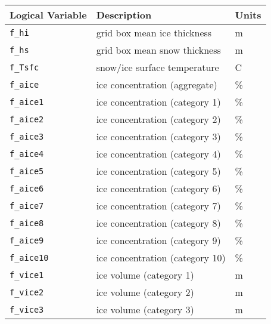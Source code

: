   \begin{center}
   \label{table:history_fields}
   \tablefirsthead{\hline}
   \tablelasttail{\hline}
   \begin{supertabular}{lll} \hline
Logical Variable          & Description                          & Units         \\
\hline \hline
\texttt{f\_hi}      & grid box mean ice thickness          & m             \\
\texttt{f\_hs}      & grid box mean snow thickness         & m             \\
\texttt{f\_Tsfc}    & snow/ice surface temperature         & C             \\
\texttt{f\_aice}    & ice concentration (aggregate)        & \%            \\
\texttt{f\_aice1}   & ice concentration (category 1)       & \%            \\
\texttt{f\_aice2}   & ice concentration (category 2)       & \%            \\
\texttt{f\_aice3}   & ice concentration (category 3)       & \%            \\
\texttt{f\_aice4}   & ice concentration (category 4)       & \%            \\
\texttt{f\_aice5}   & ice concentration (category 5)       & \%            \\
\texttt{f\_aice6}   & ice concentration (category 6)       & \%            \\
\texttt{f\_aice7}   & ice concentration (category 7)       & \%            \\
\texttt{f\_aice8}   & ice concentration (category 8)       & \%            \\
\texttt{f\_aice9}   & ice concentration (category 9)       & \%            \\
\texttt{f\_aice10}  & ice concentration (category 10)      & \%            \\
\texttt{f\_vice1}   & ice volume (category 1)              & m            \\
\texttt{f\_vice2}   & ice volume (category 2)              & m            \\
\texttt{f\_vice3}   & ice volume (category 3)              & m            \\

\end{supertabular}
\end{center}

